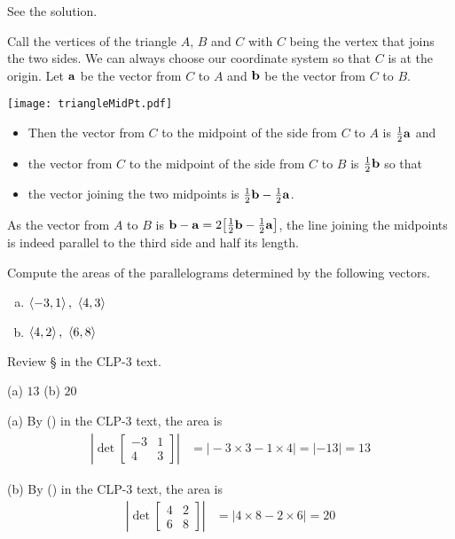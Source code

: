 \begin{answer}
See the solution.
\end{answer}

\begin{solution}
Call the vertices of the triangle $A$, $B$ and $C$ with $C$ being the
vertex that joins the two sides. We can always
choose our coordinate system so that $C$ is at the origin.
Let $\mathbf{a}$ be the vector from $C$ to $A$ 
and $\mathbf{b}$ be the vector from $C$ to $B$.
\begin{center}
     \texttt{[image: triangleMidPt.pdf]}
\end{center}
\begin{itemize}
\item
Then the vector from $C$ to the midpoint of the side from $C$ to $A$ is
$\tfrac{1}{2}\mathbf{a}$ and
\item
the vector from $C$ to the midpoint of the side from $C$ to $B$ is
$\tfrac{1}{2}\mathbf{b}$ so that
\item
the vector joining the two midpoints is $\tfrac{1}{2}\mathbf{b}-\tfrac{1}{2}\mathbf{a}$. 
\end{itemize}
As the vector from $A$ to $B$ is $\mathbf{b}-\mathbf{a}=2\big[\tfrac{1}{2}\mathbf{b}-\tfrac{1}{2}\mathbf{a}\big]$,
the line joining the midpoints is indeed parallel to the third side
and half its length.
\end{solution}


\begin{question}
Compute the areas of the parallelograms determined by the
following vectors.
\begin{enumerate}[(a)]
\item
$\left< -3,1\right>,\ \left< 4,3\right>$ 
\item
$\left< 4,2\right>,\ \left< 6,8\right>$
\end{enumerate}
\end{question}

\begin{hint}
Review \S{} in the CLP-3 text.
\end{hint}

\begin{answer}
(a) $13$\qquad
(b) $20$
\end{answer}

\begin{solution} (a)
By () in the CLP-3 text, the area is 
\begin{align*}
\left| \det\left[\begin{matrix}-3&1 \\ 4&3 \end{matrix}\right] \right|
  &=\big|-3\times 3-1\times 4\big| = |-13| = 13
\end{align*}

(b)
By () in the CLP-3 text, the area is 
\begin{align*}
\left|\det\left[\begin{matrix} 4&2 \\ 6&8 \end{matrix}\right]\right| 
&=\big|4\times 8-2\times 6\big| 
= 20
\end{align*}
\end{solution}

